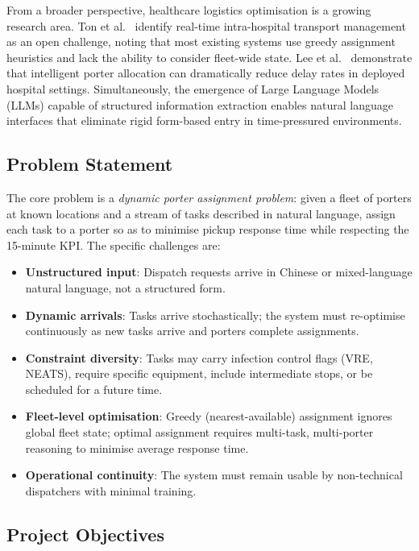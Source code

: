 \documentclass[12pt,a4paper]{article}
\begin{document}
From a broader perspective, healthcare logistics optimisation is a growing research area. Ton et al.\ \cite{ton2024} identify real-time intra-hospital transport management as an open challenge, noting that most existing systems use greedy assignment heuristics and lack the ability to consider fleet-wide state. Lee et al.\ \cite{lee2023} demonstrate that intelligent porter allocation can dramatically reduce delay rates in deployed hospital settings. Simultaneously, the emergence of Large Language Models (LLMs) capable of structured information extraction \cite{xu2024} enables natural language interfaces that eliminate rigid form-based entry in time-pressured environments.

\subsection{Problem Statement}

The core problem is a \textit{dynamic porter assignment problem}: given a fleet of porters at known locations and a stream of tasks described in natural language, assign each task to a porter so as to minimise pickup response time while respecting the 15-minute KPI. The specific challenges are:

\begin{itemize}
  \item \textbf{Unstructured input}: Dispatch requests arrive in Chinese or mixed-language natural language, not a structured form.
  \item \textbf{Dynamic arrivals}: Tasks arrive stochastically; the system must re-optimise continuously as new tasks arrive and porters complete assignments.
  \item \textbf{Constraint diversity}: Tasks may carry infection control flags (VRE, NEATS), require specific equipment, include intermediate stops, or be scheduled for a future time.
  \item \textbf{Fleet-level optimisation}: Greedy (nearest-available) assignment ignores global fleet state; optimal assignment requires multi-task, multi-porter reasoning to minimise average response time.
  \item \textbf{Operational continuity}: The system must remain usable by non-technical dispatchers with minimal training.
\end{itemize}

\subsection{Project Objectives}
\end{document}
